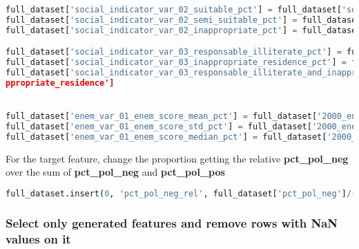 \begin{lstlisting}[language=Python]
full_dataset['social_indicator_var_02_suitable_pct'] = full_dataset['social_indicator_var_02_2000_suitable'] / full_dataset['social_indicator_var_02_2010_suitable']
full_dataset['social_indicator_var_02_semi_suitable_pct'] = full_dataset['social_indicator_var_02_2000_semi_suitable'] / full_dataset['social_indicator_var_02_2010_semi_suitable']
full_dataset['social_indicator_var_02_inappropriate_pct'] = full_dataset['social_indicator_var_02_2000_inappropriate'] / full_dataset['social_indicator_var_02_2010_inappropriate']

full_dataset['social_indicator_var_03_responsable_illiterate_pct'] = full_dataset['social_indicator_var_03_2000_responsable_illiterate'] / full_dataset['social_indicator_var_03_2010_responsable_illiterate']
full_dataset['social_indicator_var_03_inappropriate_residence_pct'] = full_dataset['social_indicator_var_03_2000_inappropriate_residence'] / full_dataset['social_indicator_var_03_2010_inappropriate_residence']
full_dataset['social_indicator_var_03_responsable_illiterate_and_inapprop riate_residence_pct'] = full_dataset['social_indicator_var_03_2000_responsable_illiterate_and_ina ppropriate_residence'] / full_dataset['social_indicator_var_03_2010_responsable_illiterate_and_ina
ppropriate_residence']


full_dataset['enem_var_01_enem_score_mean_pct'] = full_dataset['2000_enem_var_01_enem_score_mean'] / full_dataset['2010_enem_var_01_enem_score_mean']
full_dataset['enem_var_01_enem_score_std_pct'] = full_dataset['2000_enem_var_01_enem_score_std'] / full_dataset['2010_enem_var_01_enem_score_std']
full_dataset['enem_var_01_enem_score_median_pct'] = full_dataset['2000_enem_var_01_enem_score_median'] / full_dataset['2010_enem_var_01_enem_score_median']
\end{lstlisting}

For the target feature, change the proportion getting the relative
\textbf{pct\_pol\_neg} over the sum of \textbf{pct\_pol\_neg} and
\textbf{pct\_pol\_pos}

\begin{lstlisting}[language=Python]
full_dataset.insert(0, 'pct_pol_neg_rel', full_dataset['pct_pol_neg']/(full_dataset['pct_pol_neg']+full_dataset['pct_pol_pos']))
\end{lstlisting}

\hypertarget{select-only-generated-features-and-remove-rows-with-nan-values-on-it}{%
\subsubsection{Select only generated features and remove rows with NaN
values on
it}\label{select-only-generated-features-and-remove-rows-with-nan-values-on-it}}

